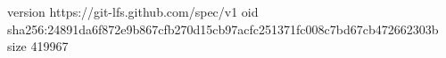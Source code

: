version https://git-lfs.github.com/spec/v1
oid sha256:24891da6f872e9b867cfb270d15cb97acfc251371fc008c7bd67cb472662303b
size 419967

